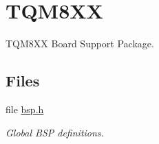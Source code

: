 \hypertarget{group__RTEMSBSPsPowerPCTQM8XX}{}\section{T\+Q\+M8\+XX}
\label{group__RTEMSBSPsPowerPCTQM8XX}


T\+Q\+M8\+XX Board Support Package.  


\subsection*{Files}
\begin{DoxyCompactItemize}
\item 
file \mbox{\hyperlink{bsps_2powerpc_2tqm8xx_2include_2bsp_8h}{bsp.\+h}}
\begin{DoxyCompactList}\small\item\em Global B\+SP definitions. \end{DoxyCompactList}\end{DoxyCompactItemize}
